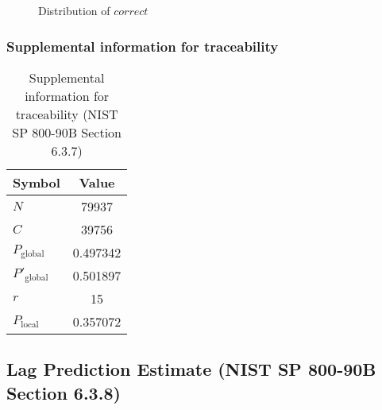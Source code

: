 \documentclass[a3paper,xelatex,english]{bxjsarticle}
\begin{document}
\begin{figure}[htbp]
\centering

\caption{Distribution of $correct$}
\end{figure}
\subsubsection{Supplemental information for traceability}
\renewcommand{\arraystretch}{1.8}
\begin{table}[h]
\caption{Supplemental information for traceability (NIST SP 800-90B Section 6.3.7)}
\begin{center}
\begin{tabular}{|l|c|}
\hline 
\rowcolor{anotherlightblue} %
Symbol				& Value \\ \hline 
$N$				& 79937\\ \hline 
$C$				& 39756\\ \hline 
$P_{\textrm{global}}$				& 0.497342\\ \hline 
$P'_{\textrm{global}}$			& 0.501897\\ \hline 
$r$				& 15\\ \hline 
$P_{\textrm{local}}$ 			& 0.357072\\ \hline
\end{tabular}
\end{center}
\end{table}
\renewcommand{\arraystretch}{1.4}
\clearpage
\subsection{Lag Prediction Estimate (NIST SP 800-90B Section 6.3.8)}\label{sec:Binary638}
\end{document}
